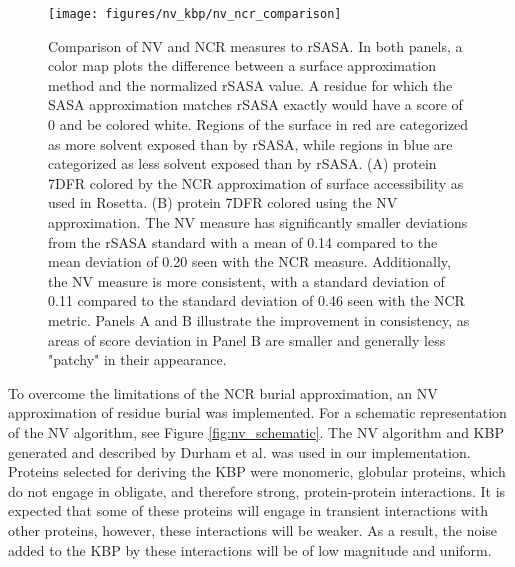 \begin{figure}
\centering
\texttt{[image: figures/nv\_kbp/nv\_ncr\_comparison]}
\caption{
Comparison of \acs{NV} and \acs{NCR} measures to \acs{rSASA}.
In both panels, a color map plots the difference between a surface approximation method and the normalized \acs{rSASA} value.
A residue for which the \acs{SASA} approximation matches \acs{rSASA} exactly would have a score of 0 and be colored white.
Regions of the surface in red are categorized as more solvent exposed than by \acs{rSASA}, while regions in blue are categorized as less solvent exposed than by \acs{rSASA}.
(A) protein 7DFR colored by the \acs{NCR} approximation of surface accessibility as used in Rosetta.
(B) protein 7DFR colored using the \acs{NV} approximation.
The \acs{NV} measure has significantly smaller deviations from the \acs{rSASA} standard with a mean of 0.14 compared to the mean deviation of 0.20 seen with the \acs{NCR} measure.
Additionally, the \acs{NV} measure is more consistent, with a standard deviation of 0.11 compared to the standard deviation of 0.46 seen with the \acs{NCR} metric.
Panels A and B illustrate the improvement in consistency, as areas of score deviation in Panel B are smaller and generally less "patchy" in their appearance.
}
\label{fig:nv_ncr_comparison}
\end{figure}

To overcome the limitations of the \ac{NCR} burial approximation, an \ac{NV} approximation of residue burial was implemented.
For a schematic representation of the \ac{NV} algorithm, see Figure \ref{fig:nv_schematic}.
The \ac{NV} algorithm and \ac{KBP} generated and described by Durham et al\citep{Durham:2009kt}.
was used in our implementation.
Proteins selected for deriving the \ac{KBP} were monomeric, globular proteins, which do not engage in obligate, and therefore strong, protein-protein interactions.
It is expected that some of these proteins will engage in transient interactions with other proteins, however, these interactions will be weaker.
As a result, the noise added to the \ac{KBP} by these interactions will be of low magnitude and uniform.

